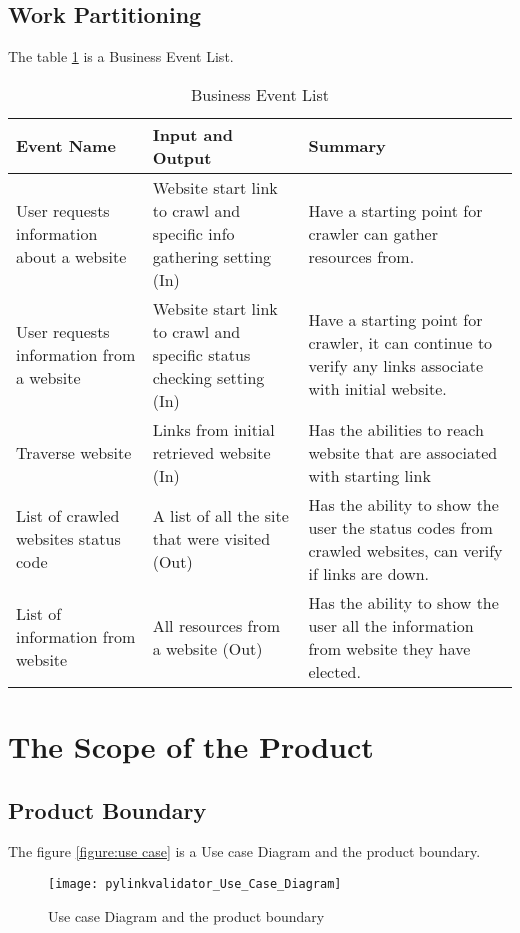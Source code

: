 \documentclass[titlepage]{article}
\begin{document}
\subsection*{Work Partitioning}
The table \ref{table:Business Event List} is a Business Event List.

\begin{table}[H]
    \begin{tabular}{| p{5cm} | p{5cm} | p{5cm} |}    \hline
    Event Name &	Input and Output	 & Summary\\ \hline
    User requests information about a website	& Website start link to crawl and specific info gathering setting (In)	& Have a starting point for crawler can gather resources from. \\ \hline
    User requests information from a website	 & Website start link to crawl and specific status checking setting (In)	& Have a starting point for crawler, it can continue to verify any links associate with initial website.\\ \hline
    Traverse website	& Links from initial retrieved website (In)	& Has the abilities to reach website that are associated with starting link \\ \hline
    
    List of crawled websites status code & 	A list of all the site that were visited (Out)	& Has the ability to show the user the status codes from crawled websites, can verify if links are down. \\ \hline
     
      List of information from website	& All resources from a website (Out)	& Has the ability to show the user all the information from website they have elected. \\ \hline
      
    \end{tabular}
    \caption{Business Event List}
\label{table:Business Event List}
\end{table}
\lipsum[7]


\section{The Scope of the Product}
\subsection*{Product Boundary}
The figure \ref{figure:use case} is a Use case Diagram and the product boundary.
\begin{figure}[H]
  \caption{Use case Diagram and the product boundary}
  \centering
    \texttt{[image: pylinkvalidator\_Use\_Case\_Diagram]}
\end{figure}
\lipsum[8]
\label{figure:use case}
\end{document}
